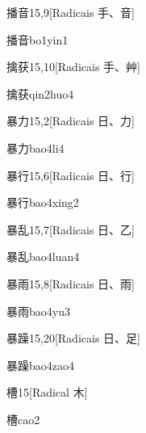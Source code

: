 \begin{entry}{播音}{15,9}[Radicais ⼿、⾳]
  \begin{phonetics}{播音}{bo1yin1}
  \end{phonetics}
\end{entry}

\begin{entry}{擒获}{15,10}[Radicais ⼿、⾋]
  \begin{phonetics}{擒获}{qin2huo4}
  \end{phonetics}
\end{entry}

\begin{entry}{暴力}{15,2}[Radicais ⽇、⼒]
  \begin{phonetics}{暴力}{bao4li4}
  \end{phonetics}
\end{entry}

\begin{entry}{暴行}{15,6}[Radicais ⽇、⾏]
  \begin{phonetics}{暴行}{bao4xing2}
  \end{phonetics}
\end{entry}

\begin{entry}{暴乱}{15,7}[Radicais ⽇、⼄]
  \begin{phonetics}{暴乱}{bao4luan4}
  \end{phonetics}
\end{entry}

\begin{entry}{暴雨}{15,8}[Radicais ⽇、⾬]
  \begin{phonetics}{暴雨}{bao4yu3}
  \end{phonetics}
\end{entry}

\begin{entry}{暴躁}{15,20}[Radicais ⽇、⾜]
  \begin{phonetics}{暴躁}{bao4zao4}
  \end{phonetics}
\end{entry}

\begin{entry}{槽}{15}[Radical ⽊]
  \begin{phonetics}{槽}{cao2}
  \end{phonetics}
\end{entry}

